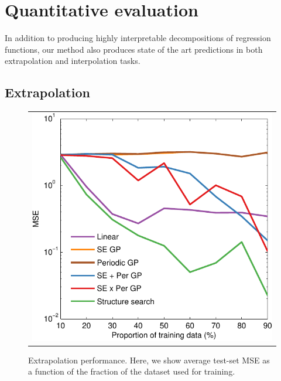 \documentclass[twoside]{article}
\begin{document}
\section{Quantitative evaluation}

In addition to producing highly interpretable decompositions of regression functions, our method also produces state of the art predictions in both extrapolation and interpolation tasks.

\subsection{Extrapolation}

\begin{figure}[h!]
\centering
\begin{tabular}{c}
\hspace{-0.5cm} \includegraphics[width=0.95\columnwidth]{../figures/extrapolation_curves/01-airline-s-ex-curve_hint.pdf}
\end{tabular}
\caption{Extrapolation performance.  Here, we show average test-set MSE as a function of the fraction of the dataset used for training. 
}
\label{fig:extrapolation}
\end{figure}
\end{document}

